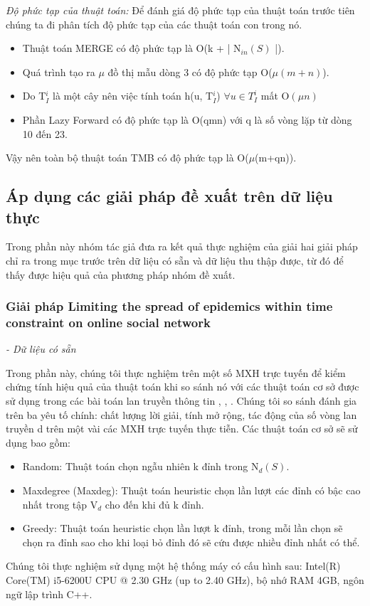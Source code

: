 {\itshape Độ phức tạp của thuật toán: }		
Để đánh giá độ phức tạp của thuật toán trước tiên chúng ta đi phân tích độ phức tạp của các thuật toán con trong nó.
\begin {itemize}
\item Thuật toán MERGE có độ phức tạp là O(k + | N$_{in}(S)$ |).

\item Quá trình tạo ra $\mu$ đồ thị mẫu dòng 3 có độ phức tạp O($\mu(m + n)$).

\item Do T$_{I}^i$ là một cây nên việc tính toán h(u, T$_{I}^i$) $\forall u \in T_{I}^i$ mất O$(\mu n)$ 

\item Phần Lazy Forward có độ phức tạp là O(qmn) với q là số vòng lặp từ dòng 10 đến 23.
\end {itemize}
Vậy nên toàn bộ thuật toán TMB có độ phức tạp là O($\mu$(m+qn)).
	
	\subsection{ Áp dụng các giải pháp đề xuất trên dữ liệu thực}
	Trong phần này nhóm tác giả đưa ra kết quả thực nghiệm của giải hai giải pháp chỉ ra trong mục trước trên dữ liệu có sẵn và dữ liệu thu thập được, từ đó để thấy được hiệu quả của phương pháp nhóm đề xuất.
		
		\subsubsection{Giải pháp Limiting the spread of epidemics within time constraint on online social network}
		{\itshape - Dữ liệu có sẵn}
		
		Trong phần này, chúng tôi thực nghiệm trên một số MXH trực tuyến để kiểm chứng tính hiệu quả của thuật toán khi so sánh nó với các thuật toán cơ sở được sử dụng trong các bài toán lan truyền thông tin \cite{nguyen30}, \cite{kempe21}, \cite{zhang40}. Chúng tôi so sánh đánh gia trên ba yêu tố chính: chất lượng lời giải, tính mở rộng, tác động của số vòng lan truyền d trên một vài các MXH trực tuyến thực tiễn. Các thuật toán cơ sở sẽ sử dụng bao gồm:
		\begin {itemize}
			\item Random: Thuật toán chọn ngẫu nhiên k đỉnh trong N$_{d}(S)$.
		
			\item Maxdegree (Maxdeg): Thuật toán heuristic chọn lần lượt các đỉnh có bậc cao nhất trong tập V$_{d}$ cho đến khi đủ k đỉnh.
		
			\item Greedy: Thuật toán heuristic chọn lần lượt k đỉnh, trong mỗi lần chọn sẽ chọn ra đỉnh sao cho khi loại bỏ đỉnh đó sẽ cứu được nhiều đỉnh nhất có thể.
		\end {itemize}
		Chúng tôi thực nghiệm sử dụng một hệ thống máy có cấu hình sau: Intel(R) Core(TM) i5-6200U CPU @ 2.30 GHz (up to 2.40 GHz), bộ nhớ RAM 4GB, ngôn ngữ lập trình C++.
		
